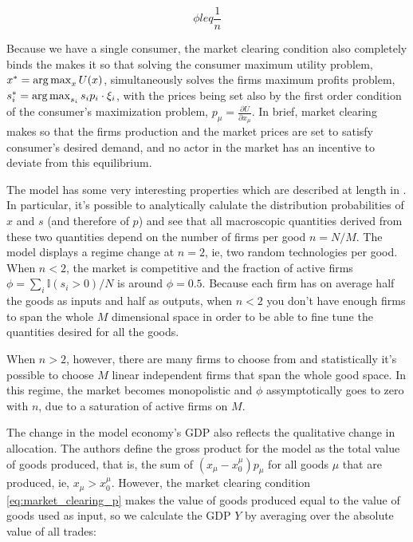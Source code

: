 \begin{equation}
  \label{eq:4}
  \phi leq \frac{1}{n}
\end{equation}


Because we have a single consumer, the market clearing condition also
completely binds the makes
it so that solving the consumer maximum utility problem,
$x^* = \operatorname*{arg\,max}_x U(x)$, simultaneously solves the firms maximum
profits problem, $s_i^* = \operatorname*{arg\,max}_{s_i} s_i p_i \cdot \xi_i$, with the
prices being set also by the first order condition of the consumer's
maximization problem, $p_\mu = \frac{\partial U}{\partial x_\mu}$. In
brief, market clearing makes so that the firms production and the
market prices are set to satisfy consumer's desired demand, and no
actor in the market has an incentive to deviate from this equilibrium.



The model has some very interesting properties which are described at
length in \cite{DeMartinoMarsili04}. In particular, it's possible to
analytically calulate the distribution probabilities of $x$ and $s$
(and therefore of $p$) and see that all macroscopic quantities derived
from these two quantities depend on the number of firms per good
$n = N/M$. The model displays a regime change at $n=2$, ie, two random
technologies per good. When $n<2$, the market is competitive and the
fraction of active firms $\phi = \sum_i \mathbb{I}(s_i > 0) / N$ is
around $\phi = 0.5$. Because each firm has on average half the goods
as inputs and half as outputs, when $n<2$ you don't have enough firms
to span the whole $M$ dimensional space in order to be able to fine
tune the quantities desired for all the goods.

When $n>2$, however, there are many firms to choose from and
statistically it's possible to choose $M$ linear independent firms
that span the whole good space. In this regime, the market becomes
monopolistic and $\phi$ assymptotically goes to zero with $n$, due to
a saturation of active firms on $M$. 

The change in the model economy's GDP also reflects the qualitative
change in allocation. The authors define the gross product for the
model as the total value of goods produced, that is, the sum of
$(x_\mu - x_0^\mu)p_\mu$ for all goods $\mu$ that are produced, ie,
$x_\mu > x_0^\mu$. However, the market clearing condition
\eqref{eq:market_clearing_p} makes the value of goods produced equal
to the value of goods used as input, so we calculate the GDP $Y$ by
averaging over the absolute value of all trades:

